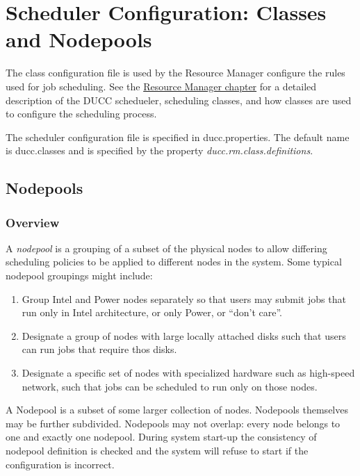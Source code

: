 \section{Scheduler Configuration: Classes and Nodepools}
\label{sec:ducc.classes}

The class configuration file is used by the Resource Manager configure the rules used for job
scheduling. See the \hyperref[sec:]{Resource Manager chapter} for a detailed description of the DUCC
schedueler, scheduling classes, and how classes are used to configure the scheduling process.

The scheduler  configuration file is specified in ducc.properties. The default name is 
ducc.classes and is specified by the property {\em ducc.rm.class.definitions}.
  
\subsection{Nodepools}

\subsubsection{Overview}
    A {\em nodepool} is a grouping of a subset of the physical nodes to allow differing
    scheduling policies to be applied to different nodes in the system.  Some typical
    nodepool groupings might include:
    \begin{enumerate}
      \item Group Intel and Power nodes separately so that users may submit jobs that run
        only in Intel architecture, or only Power, or ``don't care''.
      \item Designate a group of nodes with large locally attached disks such that users
        can run jobs that require thos disks.
      \item Designate a specific set of nodes with specialized hardware such as high-speed
        network, such that jobs can be scheduled to run only on those nodes.
    \end{enumerate}

    A Nodepool is a subset of some larger collection of nodes.  Nodepools themselves may be
    further subdivided.  Nodepools may not overlap: every node belongs to one and exactly
    one nodepool.  During system start-up the consistency of nodepool definition is checked
    and the system will refuse to start if the configuration is incorrect.

